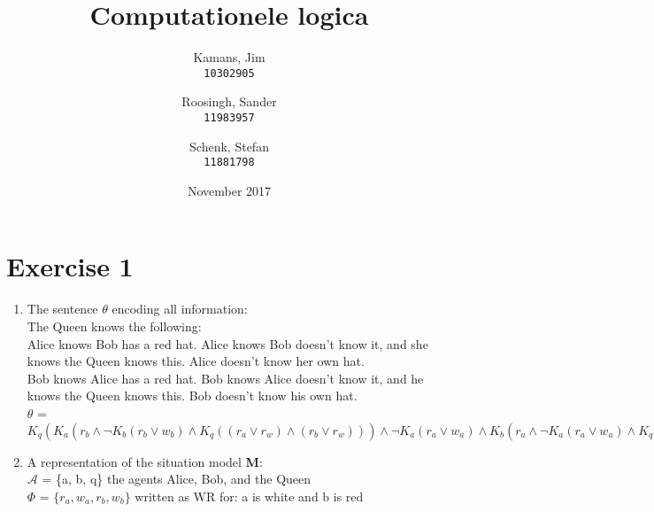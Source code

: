 \documentclass[leqno]{article}
\title{Computationele logica}
\author{
    Kamans, Jim\\
    \texttt{10302905}
    \and
    Roosingh, Sander\\
    \texttt{11983957}
    \and
    Schenk, Stefan\\
    \texttt{11881798}
}
\date{November 2017}
\begin{document}
\maketitle


\section*{Exercise 1}

\begin{enumerate}

    \item The sentence $\theta$ encoding all information: \\

    The Queen knows the following: \\
    Alice knows Bob has a red hat. Alice knows Bob doesn't know it, and she
    knows the Queen knows this. Alice doesn't know her own hat. \\
    Bob knows Alice has a red hat. Bob knows Alice doesn't know it, and he
    knows the Queen knows this. Bob doesn't know his own hat. \\

    $\theta$ =
        $K_q (
        K_a (
            r_b \wedge
            \neg K_b (r_b \vee w_b) \wedge
            K_q ((r_a \vee r_w) \wedge (r_b \vee r_w))
        )
        \wedge \neg K_a (r_a \vee w_a)
        \wedge
        K_b (
            r_a \wedge
            \neg K_a (r_a \vee w_a) \wedge
            K_q ((r_a \vee r_w) \wedge (r_b \vee r_w))
        )
        \wedge \neg K_b (r_b \vee w_b)
        )$

    \item A representation of the situation model \textbf{M}: \\

    $\mathcal{A}$ = \{a, b, q\} the agents Alice, Bob, and the Queen \\
    $\Phi$ = $\{r_a, w_a, r_b, w_b\}$ written as WR for:
    a is white and b is red \\


\end{enumerate}
\end{document}
